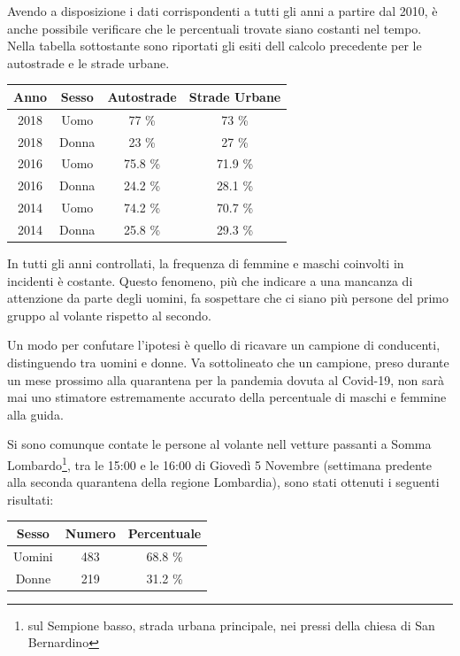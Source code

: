 \documentclass[a4paper,12pt]{report}
\begin{document}
Avendo a disposizione i dati corrispondenti a tutti gli anni a partire dal 2010, 
è anche possibile verificare che le percentuali trovate siano costanti  
nel tempo. 
Nella tabella sottostante sono riportati gli esiti dell calcolo precedente per le 
autostrade e le strade urbane. 

\begin{center}
    \def\arraystretch{1.5}%
    \begin{tabular}{ |c|c|c|c| }
        \hline
        Anno & Sesso & Autostrade & Strade Urbane \\ 
        \hline
        \rowcolor{TableGray}
        2018 & Uomo & 77 \%  & 73 \% \\
        2018 & Donna & 23 \% & 27 \% \\
        \rowcolor{TableGray}
        2016 & Uomo & 75.8 \%  & 71.9 \% \\
        2016 & Donna & 24.2 \% & 28.1 \% \\
        \rowcolor{TableGray}
        2014 & Uomo & 74.2 \%  & 70.7 \% \\
        2014 & Donna & 25.8 \% & 29.3 \% \\
        \hline
    \end{tabular}
\end{center}

In tutti gli anni controllati, la frequenza di femmine e maschi coinvolti 
in incidenti è costante. 
Questo fenomeno, più che indicare a una mancanza di attenzione da parte degli uomini, 
fa sospettare che ci siano più persone del primo gruppo al volante rispetto al secondo. 

Un modo per confutare l'ipotesi è quello di ricavare un campione di conducenti, 
distinguendo tra uomini e donne. 
Va sottolineato che un campione, preso durante un mese prossimo alla quarantena per 
la pandemia dovuta al Covid-19, non sarà mai uno stimatore estremamente 
accurato della percentuale di maschi e femmine alla guida. 

Si sono comunque contate le persone al volante nell vetture passanti a Somma 
Lombardo\footnote{sul Sempione basso, strada urbana principale, 
nei pressi della chiesa di San Bernardino}, 
tra le 15:00 e le 16:00 di Giovedì 5 Novembre 
(settimana predente alla seconda quarantena della regione Lombardia), 
sono stati ottenuti i seguenti risultati:

\begin{center}
    \def\arraystretch{1.5}%
    \begin{tabular}{ |c|c|c| }
        \hline
        Sesso & Numero & Percentuale \\ 
        \hline
        \rowcolor{TableGray}
        Uomini & 483 & 68.8 \% \\
        Donne & 219 & 31.2 \% \\
        \hline
    \end{tabular}
\end{center}
\end{document}
